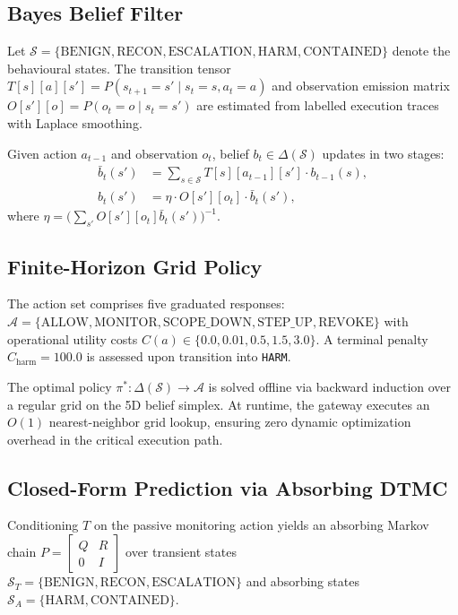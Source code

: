 \documentclass[conference]{IEEEtran}
\begin{document}
\subsection{Bayes Belief Filter}
Let $\mathcal{S} = \{\text{BENIGN}, \text{RECON}, \text{ESCALATION}, \text{HARM}, \text{CONTAINED}\}$ denote the behavioural states. The transition tensor $T[s][a][s'] = P(s_{t+1}=s' \mid s_t=s, a_t=a)$ and observation emission matrix $O[s'][o] = P(o_t=o \mid s_t=s')$ are estimated from labelled execution traces with Laplace smoothing.

Given action $a_{t-1}$ and observation $o_t$, belief $b_t \in \Delta(\mathcal{S})$ updates in two stages:
\begin{align}
\bar{b}_t(s') &= \sum_{s \in \mathcal{S}} T[s][a_{t-1}][s'] \cdot b_{t-1}(s), \label{eq:predict} \\
b_t(s') &= \eta \cdot O[s'][o_t] \cdot \bar{b}_t(s'), \label{eq:update}
\end{align}
where $\eta = \big(\sum_{s'} O[s'][o_t] \bar{b}_t(s')\big)^{-1}$.

\subsection{Finite-Horizon Grid Policy}
The action set comprises five graduated responses: $\mathcal{A} = \{\text{ALLOW}, \text{MONITOR}, \text{SCOPE\_DOWN}, \text{STEP\_UP}, \text{REVOKE}\}$ with operational utility costs $C(a) \in \{0.0, 0.01, 0.5, 1.5, 3.0\}$. A terminal penalty $C_{\text{harm}} = 100.0$ is assessed upon transition into \texttt{HARM}.

The optimal policy $\pi^*: \Delta(\mathcal{S}) \to \mathcal{A}$ is solved offline via backward induction over a regular grid on the 5D belief simplex. At runtime, the gateway executes an $O(1)$ nearest-neighbor grid lookup, ensuring zero dynamic optimization overhead in the critical execution path.

\subsection{Closed-Form Prediction via Absorbing DTMC}
Conditioning $T$ on the passive monitoring action yields an absorbing Markov chain $P = \begin{bmatrix} Q & R \\ 0 & I \end{bmatrix}$ over transient states $\mathcal{S}_T = \{\text{BENIGN}, \text{RECON}, \text{ESCALATION}\}$ and absorbing states $\mathcal{S}_A = \{\text{HARM}, \text{CONTAINED}\}$.
\end{document}
